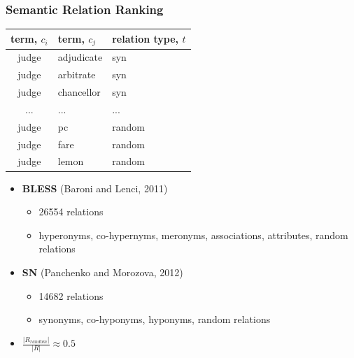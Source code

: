 \documentclass{beamer}
\begin{document}
\begin{frame}
\frametitle{Semantic Relation Ranking}

{ \scriptsize

\begin{table}[h]\footnotesize
\begin{tabular}{ |c|l|l| }
\hline
term, $c_i$ & term, $c_j$ & relation type, $t$  \\ \hline \hline
judge & adjudicate & syn \\
judge & arbitrate & syn \\
judge & chancellor & syn \\
... & ... & ...   \\
judge & pc & random \\ 
judge & fare & random \\
judge & lemon & random \\ \hline
\end{tabular}
\end {table}

}

\begin{itemize}
  \item \textbf{BLESS} (Baroni and Lenci, 2011)
  \begin{itemize}
    \item 26554 relations
    \item hyperonyms, co-hypernyms, meronyms, associations, attributes, random relations
    \end{itemize}  
  \item \textbf{SN} (Panchenko and Morozova, 2012)
  \begin{itemize}
    \item 14682  relations\
    \item synonyms, co-hyponyms, hyponyms, random relations
    \end{itemize}
    
    \item $\frac{|R_{random}|}{|R|} \approx 0.5$
     
\end{itemize}

\end{frame}
\end{document}
